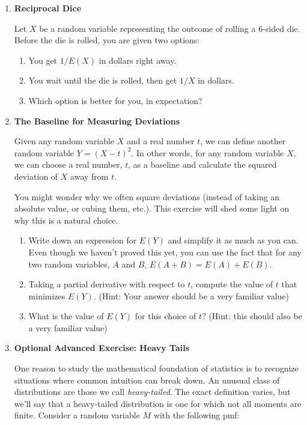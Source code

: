 \documentclass[12pt,a4paper]{article}
\numberwithin{equation}{subsection}
\begin{document}
\begin{enumerate}
\item \textbf{Reciprocal Dice}

Let $X$ be a random variable representing the outcome of rolling a 6-sided die.  Before the die is rolled, you are given two options:

\begin{enumerate}
\item You get $1/E(X)$ in dollars right away.
\item You wait until the die is rolled, then get $1/X$ in dollars.
\item Which option is better for you, in expectation?
\end{enumerate}



\item \textbf{The Baseline for Measuring Deviations}

Given any random variable $X$ and a real number $t$, we can define another random variable $Y = (X - t)^2$. In other words, for any random variable $X$, we can choose a real number, $t$, as a baseline and calculate the squared deviation of $X$ away from $t$.

You might wonder why we often square deviations (instead of taking an absolute value, or cubing them, etc.).  This exercise will shed some light on why this is a natural choice.

\begin{enumerate}
\item Write down an expression for $E(Y)$ and simplify it as much as you can.  Even though we haven't proved this yet, you can use the fact that for any two random variables, $A$ and $B$, $E(A + B) = E(A) + E(B)$.
\item Taking a partial derivative with respect to $t$, compute the value of $t$ that minimizes $E(Y)$.  (Hint: Your answer should be a very familiar value)
\item What is the value of $E(Y)$ for this choice of $t$?
(Hint: this should also be a very familiar value)
\end{enumerate}

\item \textbf{Optional Advanced Exercise: Heavy Tails}

One reason to study the mathematical foundation of statistics is to recognize situations where common intuition can break down.  An unusual class of distributions are those we call \textit{heavy-tailed}.  The exact definition varies, but we'll say that a heavy-tailed distribution is one for which not all moments are finite.  Consider a random variable $M$ with the following pmf:


\end{enumerate}
\end{document}
